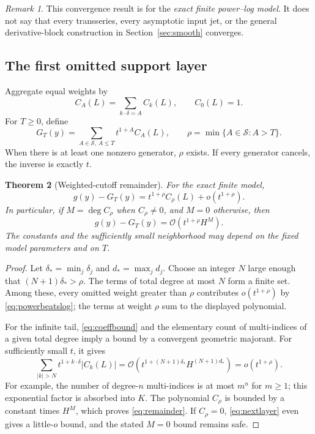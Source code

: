 \documentclass[11pt,a4paper]{article}
\numberwithin{equation}{section}
\newtheorem{theorem}{Theorem}[section]
\theoremstyle{definition}\newtheorem{definition}[theorem]{Definition}
\theoremstyle{remark}\newtheorem{remark}[theorem]{Remark}
\newcommand{\OO}{\mathcal O}\newcommand{\Id}{\mathrm{id}}
\begin{document}
\begin{remark}
This convergence result is for the \emph{exact finite power--log model}. It does not say that every transseries, every asymptotic input jet, or the general derivative-block construction in Section~\ref{sec:smooth} converges.
\end{remark}

\subsection{The first omitted support layer}
Aggregate equal weights by
\[
C_A(L)=\sum_{k\cdot\delta=A}C_k(L),\qquad C_0(L)=1.
\]
For $T\ge0$, define
\[
G_T(y)=\sum_{A\in\mathcal S,\,A\le T}t^{1+A}C_A(L),
\qquad
\rho=\min\{A\in\mathcal S:A>T\}.
\]
When there is at least one nonzero generator, $\rho$ exists. If every generator cancels, the inverse is exactly $t$.

\begin{theorem}[Weighted-cutoff remainder]\label{thm:remainder}
For the exact finite model,
\begin{equation}\label{eq:nextlayer}
g(y)-G_T(y)=t^{1+\rho}C_\rho(L)+o(t^{1+\rho}).
\end{equation}
In particular, if $M=\deg C_\rho$ when $C_\rho\ne0$, and $M=0$ otherwise, then
\begin{equation}\label{eq:remainder}
g(y)-G_T(y)=\OO\!\left(t^{1+\rho}H^M\right).
\end{equation}
The constants and the sufficiently small neighborhood may depend on the fixed model parameters and on $T$.
\end{theorem}
\begin{proof}
Let $\delta_* =\min_j\delta_j$ and $d_* =\max_j d_j$. Choose an integer $N$ large enough that $(N+1)\delta_*>\rho$. The terms of total degree at most $N$ form a finite set. Among these, every omitted weight greater than $\rho$ contributes $o(t^{1+\rho})$ by \eqref{eq:powerbeatslog}; the terms at weight $\rho$ sum to the displayed polynomial.

For the infinite tail, \eqref{eq:coeffbound} and the elementary count of multi-indices of a given total degree imply a bound by a convergent geometric majorant. For sufficiently small $t$, it gives
\[
\sum_{|k|>N}t^{1+k\cdot\delta}|C_k(L)|
=\OO\!\left(t^{1+(N+1)\delta_*}H^{(N+1)d_*}\right)
=o(t^{1+\rho}).
\]
For example, the number of degree-$n$ multi-indices is at most $m^n$ for $m\ge1$; this exponential factor is absorbed into $K$. The polynomial $C_\rho$ is bounded by a constant times $H^M$, which proves \eqref{eq:remainder}. If $C_\rho=0$, \eqref{eq:nextlayer} even gives a little-$o$ bound, and the stated $M=0$ bound remains safe.
\end{proof}
\end{document}
